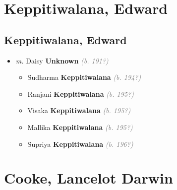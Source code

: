 \documentclass[10pt, openany]{book}
\begin{document}
\part{Keppitiwalana, Edward}
\chapter{Keppitiwalana, Edward}
\label{00000470}
\textcolor{slmaroon}{\textit{}}
\begin{itemize}
\item{\textit{m.} Daisy \textbf{Unknown} \textcolor{gray}{\textit{(b. 191?)}}   \label{couple:00000470:00000869} \begin{itemize}
\item{Sudharma \textbf{Keppitiwalana} \textcolor{gray}{\textit{(b. 194?)}}
 }
\item{Ranjani \textbf{Keppitiwalana} \textcolor{gray}{\textit{(b. 195?)}}
 }
\item{Visaka \textbf{Keppitiwalana} \textcolor{gray}{\textit{(b. 195?)}}
 }
\item{Mallika \textbf{Keppitiwalana} \textcolor{gray}{\textit{(b. 195?)}}
 }
\item{Supriya \textbf{Keppitiwalana} \textcolor{gray}{\textit{(b. 196?)}}
 }
\end{itemize}}
\end{itemize}
 
\part{Cooke, Lancelot Darwin}
\end{document}
